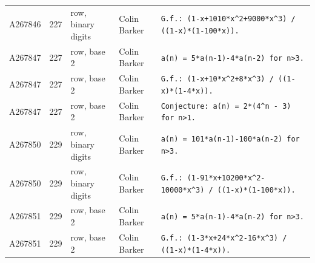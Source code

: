 \documentclass[11pt]{article}
\theoremstyle{definition}
\theoremstyle{remark}
\begin{document}
{\begin{longtable}{p{1.3cm}p{0.7cm}p{2.4cm}p{2.3cm}p{7.3cm}}
A267846 & 227 & row, binary digits & Colin Barker & \texttt{G.f.: \allowbreak{}(1-\allowbreak{}x+\allowbreak{}1010*\allowbreak{}x\^{}2+\allowbreak{}9000*\allowbreak{}x\^{}3)\allowbreak{} \allowbreak{}/\allowbreak{} \allowbreak{}((1-\allowbreak{}x)\allowbreak{}*\allowbreak{}(1-\allowbreak{}100*\allowbreak{}x)\allowbreak{})\allowbreak{}.} \\
A267847 & 227 & row, base 2 & Colin Barker & \texttt{a(n)\allowbreak{} \allowbreak{}=\allowbreak{} \allowbreak{}5*\allowbreak{}a(n-\allowbreak{}1)\allowbreak{}-\allowbreak{}4*\allowbreak{}a(n-\allowbreak{}2)\allowbreak{} \allowbreak{}for \allowbreak{}n>3.} \\
A267847 & 227 & row, base 2 & Colin Barker & \texttt{G.f.: \allowbreak{}(1-\allowbreak{}x+\allowbreak{}10*\allowbreak{}x\^{}2+\allowbreak{}8*\allowbreak{}x\^{}3)\allowbreak{} \allowbreak{}/\allowbreak{} \allowbreak{}((1-\allowbreak{}x)\allowbreak{}*\allowbreak{}(1-\allowbreak{}4*\allowbreak{}x)\allowbreak{})\allowbreak{}.} \\
A267847 & 227 & row, base 2 & Colin Barker & \texttt{Conjecture: \allowbreak{}a(n)\allowbreak{} \allowbreak{}=\allowbreak{} \allowbreak{}2*\allowbreak{}(4\^{}n \allowbreak{}-\allowbreak{} \allowbreak{}3)\allowbreak{} \allowbreak{}for \allowbreak{}n>1.} \\
A267850 & 229 & row, binary digits & Colin Barker & \texttt{a(n)\allowbreak{} \allowbreak{}=\allowbreak{} \allowbreak{}101*\allowbreak{}a(n-\allowbreak{}1)\allowbreak{}-\allowbreak{}100*\allowbreak{}a(n-\allowbreak{}2)\allowbreak{} \allowbreak{}for \allowbreak{}n>3.} \\
A267850 & 229 & row, binary digits & Colin Barker & \texttt{G.f.: \allowbreak{}(1-\allowbreak{}91*\allowbreak{}x+\allowbreak{}10200*\allowbreak{}x\^{}2-\allowbreak{}10000*\allowbreak{}x\^{}3)\allowbreak{} \allowbreak{}/\allowbreak{} \allowbreak{}((1-\allowbreak{}x)\allowbreak{}*\allowbreak{}(1-\allowbreak{}100*\allowbreak{}x)\allowbreak{})\allowbreak{}.} \\
A267851 & 229 & row, base 2 & Colin Barker & \texttt{a(n)\allowbreak{} \allowbreak{}=\allowbreak{} \allowbreak{}5*\allowbreak{}a(n-\allowbreak{}1)\allowbreak{}-\allowbreak{}4*\allowbreak{}a(n-\allowbreak{}2)\allowbreak{} \allowbreak{}for \allowbreak{}n>3.} \\
A267851 & 229 & row, base 2 & Colin Barker & \texttt{G.f.: \allowbreak{}(1-\allowbreak{}3*\allowbreak{}x+\allowbreak{}24*\allowbreak{}x\^{}2-\allowbreak{}16*\allowbreak{}x\^{}3)\allowbreak{} \allowbreak{}/\allowbreak{} \allowbreak{}((1-\allowbreak{}x)\allowbreak{}*\allowbreak{}(1-\allowbreak{}4*\allowbreak{}x)\allowbreak{})\allowbreak{}.} \\

\end{longtable}}
\end{document}
